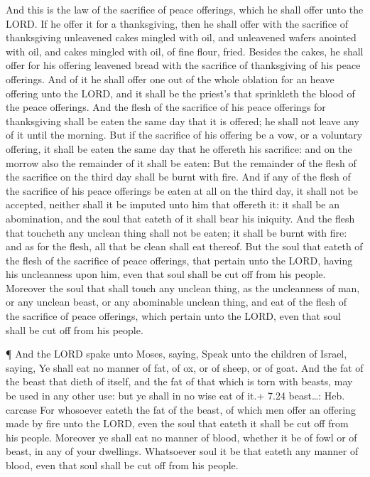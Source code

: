  And this is the law of the sacrifice of peace offerings,
which he shall offer unto the LORD.  If he offer it for a
thanksgiving, then he shall offer with the sacrifice of thanksgiving
unleavened cakes mingled with oil, and unleavened wafers anointed with
oil, and cakes mingled with oil, of fine flour, fried. 
Besides the cakes, he shall offer for his offering leavened bread with
the sacrifice of thanksgiving of his peace offerings.  And
of it he shall offer one out of the whole oblation for an heave offering
unto the LORD, and it shall be the priest's that sprinkleth the blood of
the peace offerings.  And the flesh of the sacrifice of his
peace offerings for thanksgiving shall be eaten the same day that it is
offered; he shall not leave any of it until the morning. 
But if the sacrifice of his offering be a vow, or a voluntary offering,
it shall be eaten the same day that he offereth his sacrifice: and on
the morrow also the remainder of it shall be eaten:  But
the remainder of the flesh of the sacrifice on the third day shall be
burnt with fire.  And if any of the flesh of the sacrifice
of his peace offerings be eaten at all on the third day, it shall not be
accepted, neither shall it be imputed unto him that offereth it: it
shall be an abomination, and the soul that eateth of it shall bear his
iniquity.  And the flesh that toucheth any unclean thing
shall not be eaten; it shall be burnt with fire: and as for the flesh,
all that be clean shall eat thereof.  But the soul that
eateth of the flesh of the sacrifice of peace offerings, that pertain
unto the LORD, having his uncleanness upon him, even that soul shall be
cut off from his people.  Moreover the soul that shall
touch any unclean thing, as the uncleanness of man, or any unclean
beast, or any abominable unclean thing, and eat of the flesh of the
sacrifice of peace offerings, which pertain unto the LORD, even that
soul shall be cut off from his people.

 ¶ And the LORD spake unto Moses, saying, 
Speak unto the children of Israel, saying, Ye shall eat no manner of
fat, of ox, or of sheep, or of goat.  And the fat of the
beast that dieth of itself, and the fat of that which is torn with
beasts, may be used in any other use: but ye shall in no wise eat of
it.+ 7.24 beast\ldots: Heb. carcase  For whosoever eateth
the fat of the beast, of which men offer an offering made by fire unto
the LORD, even the soul that eateth it shall be cut off from his people.
 Moreover ye shall eat no manner of blood, whether it be of
fowl or of beast, in any of your dwellings.  Whatsoever
soul it be that eateth any manner of blood, even that soul shall be cut
off from his people.

